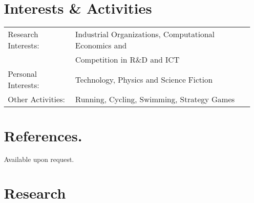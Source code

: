 \documentclass[a4paper,10pt]{article} %
\begin{document}
\section{Interests \& Activities}
\begin{tabular}{ll}
	Research Interests: & Industrial Organizations, Computational Economics and \\
						& Competition in R\&D and ICT\\
	Personal Interests: & Technology, Physics and Science Fiction\\
	Other Activities:   & Running, Cycling, Swimming, Strategy Games
\end{tabular}

\section{References.}
Available upon request.


\newpage
\newpage
\section{Research}
\end{document}
